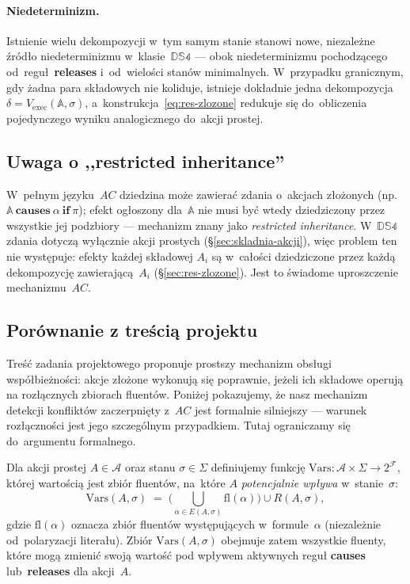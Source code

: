 \documentclass[11pt,a4paper]{article}
\newif\ifshowbib
\newcommand{\bibonly}[1]{\ifshowbib#1\fi}
\renewcommand{\cite}[2][]{\unskip}%
\newcommand{\causes}{\textbf{causes}}
\renewcommand{\iff}{\textbf{if}}
\newcommand{\releases}{\textbf{releases}}
\theoremstyle{definition}
\begin{document}
\paragraph{Niedeterminizm.}
Istnienie wielu dekompozycji w~tym samym stanie stanowi nowe, niezależne
źródło niedeterminizmu w~klasie~$\mathbb{DS4}$ --- obok niedeterminizmu
pochodzącego od~reguł~\releases{} i~od~wielości stanów minimalnych.
W~przypadku granicznym, gdy żadna para składowych nie koliduje,
istnieje dokładnie jedna dekompozycja $\delta = V_{\mathrm{exec}}(\mathbb{A},\sigma)$,
a~konstrukcja~\eqref{eq:res-zlozone} redukuje się do~obliczenia
pojedynczego wyniku analogicznego do~akcji prostej.

\subsection{Uwaga o ,,restricted inheritance''}
\label{sec:restricted-inheritance}

W~pełnym języku~$AC$\bibonly{~\cite{rw05}} dziedzina może zawierać zdania
o~akcjach złożonych (np.\ $\mathbb{A}\ \causes\ \alpha\ \iff\ \pi$); efekt ogłoszony
dla~$\mathbb{A}$ nie musi być wtedy dziedziczony przez wszystkie jej podzbiory ---
mechanizm znany jako \emph{restricted inheritance}. W~$\mathbb{DS4}$ zdania dotyczą
wyłącznie akcji prostych (\S\ref{sec:skladnia-akcji}), więc problem ten nie występuje:
efekty każdej składowej $A_i$ są w~całości dziedziczone przez każdą dekompozycję
zawierającą~$A_i$ (\S\ref{sec:res-zlozone}). Jest to świadome uproszczenie mechanizmu~$AC$.

\subsection{Porównanie z treścią projektu}
\label{sec:porownanie-rozlacznosc}

Treść zadania projektowego\bibonly{~\cite{projekt4}} proponuje prostszy
mechanizm obsługi współbieżności: akcje złożone wykonują się poprawnie,
jeżeli ich składowe operują na rozłącznych zbiorach fluentów. Poniżej
pokazujemy, że nasz mechanizm detekcji konfliktów zaczerpnięty z~$AC$
jest formalnie silniejszy --- warunek rozłączności jest jego szczególnym
przypadkiem. Tutaj ograniczamy się do~argumentu formalnego.

\medskip
\noindent Dla akcji prostej $A \in \mathcal{A}$ oraz stanu $\sigma \in \Sigma$
definiujemy funkcję $\mathrm{Vars} : \mathcal{A} \times \Sigma \to 2^{\mathcal{F}}$,
której wartością jest zbiór fluentów, na~które $A$ \emph{potencjalnie wpływa}
w~stanie~$\sigma$:
\[
  \mathrm{Vars}(A,\sigma)
    \;=\; \Big(\bigcup_{\alpha \in E(A,\sigma)} \mathrm{fl}(\alpha)\Big)
    \cup R(A,\sigma),
\]
gdzie $\mathrm{fl}(\alpha)$ oznacza zbiór fluentów występujących
w~formule~$\alpha$ (niezależnie od~polaryzacji literału). Zbiór
$\mathrm{Vars}(A,\sigma)$ obejmuje zatem wszystkie fluenty, które mogą
zmienić swoją wartość pod wpływem aktywnych reguł \causes{} lub~\releases{}
dla akcji~$A$.
\end{document}
